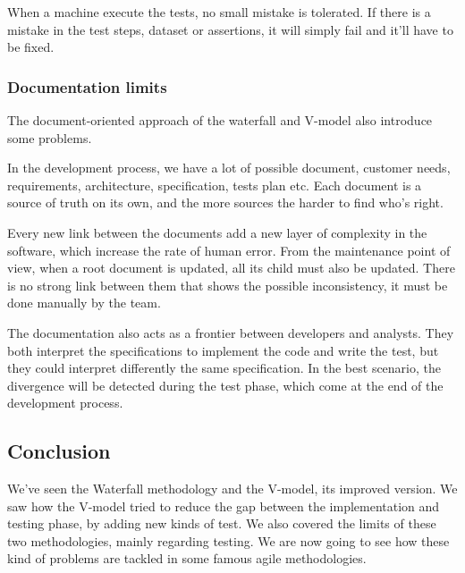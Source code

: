 When a machine execute the tests, no small mistake is tolerated.
If there is a mistake in the test steps, dataset or assertions, it will
simply fail and it'll have to be fixed.

\subsubsection{Documentation limits}
The document-oriented approach of the waterfall and V-model also introduce
some problems.

In the development process, we have a lot of possible document, customer
needs, requirements, architecture, specification, tests plan etc.
Each document is a source of truth on its own, and the more sources the
harder to find who's right.

Every new link between the documents add a new layer of complexity in the
software, which increase the rate of human error.
From the maintenance point of view, when a root document is updated, all its
child must also be updated.
There is no strong link between them that shows the possible inconsistency,
it must be done manually by the team.

The documentation also acts as a frontier between developers and analysts.
They both interpret the specifications to implement the code and write the
test, but they could interpret differently the same specification.
In the best scenario, the divergence will be detected during the test phase,
which come at the end of the development process.

\subsection{Conclusion}\label{subsec:conclusion}
We've seen the Waterfall methodology and the V-model, its improved version.
We saw how the V-model tried to reduce the gap between the implementation and
testing phase, by adding new kinds of test.
We also covered the limits of these two methodologies, mainly regarding testing.
We are now going to see how these kind of problems are tackled in some famous
agile methodologies.